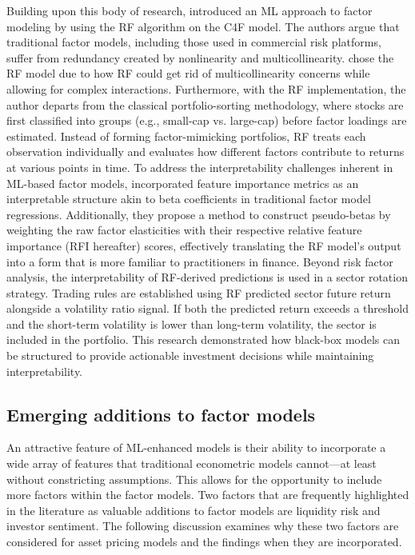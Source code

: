 Building upon this body of research,  introduced an ML approach to factor modeling by using the RF algorithm on the C4F model. The authors argue that traditional factor models, including those used in commercial risk platforms, suffer from redundancy created by nonlinearity and multicollinearity.  chose the RF model due to how RF could get rid of multicollinearity concerns while allowing for complex interactions. Furthermore, with the RF implementation, the author departs from the classical portfolio-sorting methodology, where stocks are first classified into groups (e.g., small-cap vs. large-cap) before factor loadings are estimated. Instead of forming factor-mimicking portfolios, RF treats each observation individually and evaluates how different factors contribute to returns at various points in time. To address the interpretability challenges inherent in ML-based factor models,  incorporated feature importance metrics as an interpretable structure akin to beta coefficients in traditional factor model regressions. Additionally, they propose a method to construct pseudo-betas by weighting the raw factor elasticities with their respective relative feature importance (RFI hereafter) scores, effectively translating the RF model's output into a form that is more familiar to practitioners in finance. Beyond risk factor analysis, the interpretability of RF-derived predictions is used in a sector rotation strategy. Trading rules are established using RF predicted sector future return alongside a volatility ratio signal. If both the predicted return exceeds a threshold and the short-term volatility is lower than long-term volatility, the sector is included in the portfolio. This research demonstrated how black-box models can be structured to provide actionable investment decisions while maintaining interpretability.

\subsection{Emerging additions to factor models}
An attractive feature of ML-enhanced models is their ability to incorporate a wide array of features that traditional econometric models cannot—at least without constricting assumptions. This allows for the opportunity to include more factors within the factor models. Two factors that are frequently highlighted in the literature as valuable additions to factor models are liquidity risk and investor sentiment. The following discussion examines why these two factors are considered for asset pricing models and the findings when they are incorporated.

